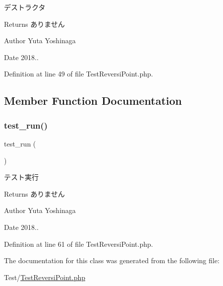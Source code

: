 デストラクタ 

\begin{DoxyReturn}{Returns}
ありません 
\end{DoxyReturn}
\begin{DoxyAuthor}{Author}
Yuta Yoshinaga 
\end{DoxyAuthor}
\begin{DoxyDate}{Date}
2018.. 
\end{DoxyDate}


Definition at line 49 of file Test\+Reversi\+Point.\+php.



\subsection{Member Function Documentation}
\mbox{\label{class_test_reversi_point_a9b029832cfdf19c0ef36b1f5ef7b7735}} 
\subsubsection{\texorpdfstring{test\+\_\+run()}{test\_run()}}
{\footnotesize\ttfamily test\+\_\+run (\begin{DoxyParamCaption}{ }\end{DoxyParamCaption})}



テスト実行 

\begin{DoxyReturn}{Returns}
ありません 
\end{DoxyReturn}
\begin{DoxyAuthor}{Author}
Yuta Yoshinaga 
\end{DoxyAuthor}
\begin{DoxyDate}{Date}
2018.. 
\end{DoxyDate}


Definition at line 61 of file Test\+Reversi\+Point.\+php.



The documentation for this class was generated from the following file\+:\begin{DoxyCompactItemize}
\item 
Test/\hyperlink{_test_reversi_point_8php}{Test\+Reversi\+Point.\+php}\end{DoxyCompactItemize}
